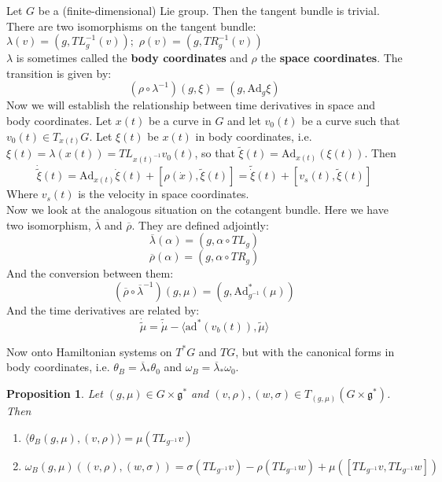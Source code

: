 \documentclass{article}
\newtheorem{prop}{Proposition}
\begin{document}
Let $G$ be a (finite-dimensional) Lie group. Then the tangent bundle is trivial. There are two isomorphisms on the tangent bundle:
$\lambda(v) = (g, TL^{-1}_g (v)); \hspace{4pt} \rho(v) = (g, TR^{-1}_g(v))$\\
\indent $\lambda$ is sometimes called the \textbf{body coordinates} and $\rho$ the \textbf{space coordinates}. The transition is given by:
\begin{equation}(\rho \circ \lambda^{-1})(g,\xi) = (g, \mathrm{Ad}_g \xi)\end{equation}
\indent Now we will establish the relationship between time derivatives in space and body coordinates. Let $x(t)$ be a curve in $G$ and let $v_0(t)$ be a curve such that $v_0(t) \in T_{x(t)}G$. Let $\xi(t)$ be $x(t)$ in body coordinates, i.e. $\xi(t) = \lambda(x(t)) = TL_{x(t)^{-1}} v_0(t)$, so that $\tilde{\xi}(t) = \mathrm{Ad}_{x(t)}(\xi(t))$. Then
\begin{equation}\dot{\tilde{\xi}}(t) = \mathrm{Ad}_{x(t)} \dot{\xi}(t) + [\rho(\dot{x}), \tilde{\xi}(t)] = \tilde{\dot{\xi}}(t) + [v_s(t), \tilde{\xi}(t)] \end{equation}
Where $v_s(t)$ is the velocity in space coordinates. \\
\indent Now we look at the analogous situation on the cotangent bundle. Here we have two isomorphism, $\overline{\lambda}$ and $\overline{\rho}$. They are defined adjointly:
\begin{equation}\overline{\lambda}(\alpha) = (g, \alpha \circ TL_g)\end{equation}
\begin{equation}\overline{\rho}(\alpha) = (g, \alpha \circ TR_g)\end{equation}
And the conversion between them:
\begin{equation} (\overline{\rho} \circ \overline{\lambda}^{-1})(g,\mu) = (g, \mathrm{Ad}^*_{g^{-1}}(\mu)) \end{equation}
And the time derivatives are related by:
\begin{equation}\dot{\tilde{\mu}} = \tilde{\dot{\mu}} - \langle \mathrm{ad}^*(v_b(t)), \tilde{\mu} \rangle\end{equation}

Now onto Hamiltonian systems on $T^*G$ and $TG$, but with the canonical forms in body coordinates, i.e. $\theta_B = \overline{\lambda}_* \theta_0$ and $ \omega_B = \overline{\lambda}_* \omega_0$.

\begin{prop}

Let $(g,\mu) \in G \times \mathfrak{g}^*$ and $(v,\rho),(w,\sigma) \in T_{(g,\mu)}(G \times \mathfrak{g}^*)$. Then
\begin{enumerate}
    \item $\langle \theta_B(g,\mu), (v,\rho) \rangle = \mu(TL_{g^{-1}} v)$
    \item $\omega_B(g,\mu)((v,\rho),(w, \sigma)) = \sigma(TL_{g^{-1}}v) - \rho(TL_{g^{-1}} w) + \mu( [TL_{g^{-1}} v, TL_{g^{-1}} w])$
\end{enumerate}
\end{prop}
\end{document}
